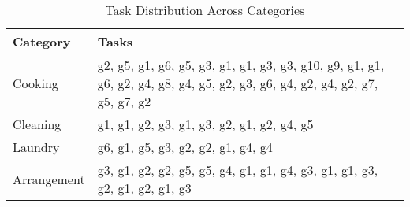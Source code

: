 \begin{table}[htbp]
\centering
\caption{Task Distribution Across Categories}
\begin{tabular}{l|l}
\hline
\textbf{Category} & \textbf{Tasks} \\
\hline
Cooking & g2, g5, g1, g6, g5, g3, g1, g1, g3, g3, g10, g9, g1, g1, g6, g2, g4, g8, g4, g5, g2, g3, g6, g4, g2, g4, g2, g7, g5, g7, g2 \\
Cleaning & g1, g1, g2, g3, g1, g3, g2, g1, g2, g4, g5 \\
Laundry & g6, g1, g5, g3, g2, g2, g1, g4, g4 \\
Arrangement & g3, g1, g2, g2, g5, g5, g4, g1, g1, g4, g3, g1, g1, g3, g2, g1, g2, g1, g3 \\
\hline
\end{tabular}
\label{tab:task_categories}
\end{table}


